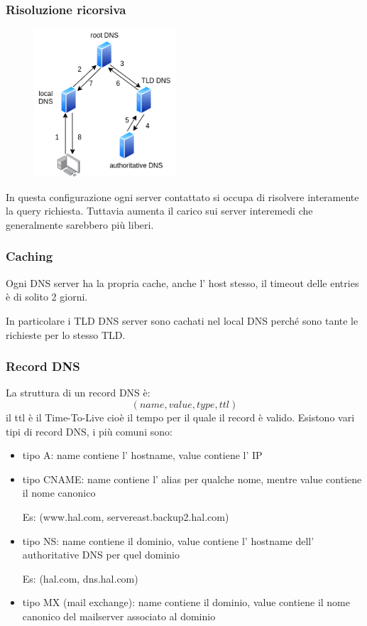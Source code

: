 \subsubsection{Risoluzione ricorsiva}
\begin{figure}[H]
    \centering
    \includegraphics[width=200px]{images/2_Applicazioni_di_rete/risoluzione_DNS_ricorsiva.png}
\end{figure}
In questa configurazione ogni server contattato si occupa di risolvere interamente la query richiesta.
Tuttavia aumenta il carico sui server interemedi che generalmente sarebbero più liberi.

\subsubsection{Caching}
Ogni DNS server ha la propria cache, anche l' host stesso, il timeout delle entries è di solito 2 giorni.

In particolare i TLD DNS server sono cachati nel local DNS perché sono tante le richieste per lo stesso TLD.

\subsubsection{Record DNS}
La struttura di un record DNS è:
$$ (name, value, type, ttl) $$
il ttl è il Time-To-Live cioè il tempo per il quale il record è valido.
Esistono vari tipi di record DNS, i più comuni sono:
\begin{itemize}
    \item tipo A: name contiene l' hostname, value contiene l' IP

    \item tipo CNAME: name contiene l' alias per qualche nome, mentre value contiene il nome canonico

    Es: (www.hal.com, servereast.backup2.hal.com)

    \item tipo NS: name contiene il dominio, value contiene l' hostname dell' authoritative DNS per quel dominio
    
    Es: (hal.com, dns.hal.com)
    
    \item tipo MX (mail exchange): name contiene il dominio, value contiene il nome canonico del mailserver associato al dominio
\end{itemize}

